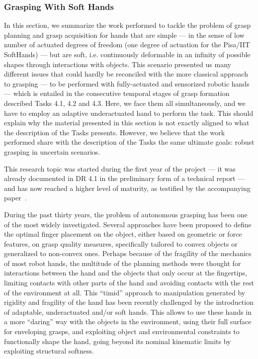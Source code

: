 
\subsubsection{Grasping With Soft Hands}

In this section, we summarize the work performed to tackle the problem of grasp planning and grasp acquisition for hands that are simple --- in the sense of low number of actuated degrees of freedom (one degree of actuation for the Pisa/IIT SoftHands) --- but are soft, i.e. continuously deformable in an infinity of possible shapes through interactions with objects. This scenario presented us many different issues that could hardly be reconciled with the more classical approach to grasping --- to be performed with fully-actuated and sensorized robotic hands --- which is entailed in the consecutive temporal stages of grasp formation described Tasks 4.1, 4.2 and 4.3. Here, we face them all simultaneously, and we have to employ an adaptive underactuated hand to perform the task. This should explain why the material presented in this section is not exactly aligned to what the description of the Tasks presents. However, we believe that the work performed share with the description of the Tasks the same ultimate goals: robust grasping in uncertain scenarios.
  
 This research topic was started during the first year of the project --- it was already documented in DR 4.1 in the preliminary form of a technical report --- and has now reached a higher level of maturity, as testified by the accompanying paper~\cite{Bonilla:Humanoids:2015}.

During the past thirty years, the problem of autonomous grasping has been one of the most widely investigated. Several approaches have been proposed to define the optimal finger placement on the object, either based on geometric or force features, on grasp quality measures, specifically tailored to convex objects or generalized to non-convex ones. Perhaps because of the fragility of the mechanics of most robot hands, the multitude of the planning methods were thought for interactions between the hand and the objects that only occur at the fingertips, limiting contacts with other parts of the hand and avoiding contacts with the rest of the environment at all. This ``timid'' approach to manipulation generated by rigidity and fragility of the hand has been recently challenged by the introduction of adaptable, underactuated and/or soft hands. This allows to use these hands in a more ``daring'' way with the objects in the environment, using their full surface for enveloping grasps, and exploiting object and environmental constraints to functionally shape the hand, going beyond its nominal kinematic limits by exploiting structural softness.

